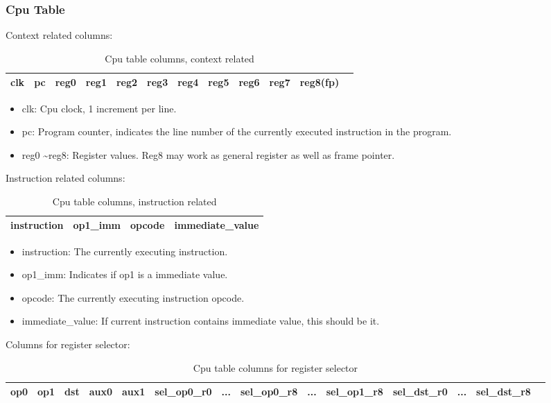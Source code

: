 \subsubsection{Cpu Table} \label{sec:cpu-table}

Context related columns:
\begin{table}[!ht]
    \centering
    \begin{tabular}{|c|c|c|c|c|c|c|c|c|c|c|c|}
        \hline
        clk & pc & reg0 & reg1 & reg2 & reg3 & reg4 & reg5 & reg6 & reg7 & reg8(fp) \\
        \hline
    \end{tabular}
    \caption{Cpu table columns, context related}
    \label{table:cpu-columns-context}
\end{table}

\begin{itemize}
    \item clk: Cpu clock, 1 increment per line.
    \item pc: Program counter, indicates the line number of the currently executed instruction in the program.
    \item reg0 \textasciitilde reg8: Register values. Reg8 may work as general register as well as frame pointer.
\end{itemize}

Instruction related columns:
\begin{table}[!ht]
    \centering
    \begin{tabular}{|c|c|c|c|}
        \hline
        instruction & op1\_imm & opcode & immediate\_value \\
        \hline
    \end{tabular}
    \caption{Cpu table columns, instruction related}
    \label{table:cpu-columns-instruction}
\end{table}

\begin{itemize}
    \item instruction: The currently executing instruction.
    \item op1\_imm: Indicates if op1 is a immediate value.
    \item opcode: The currently executing instruction opcode.
    \item immediate\_value: If current instruction contains immediate value, this should be it.
\end{itemize}

Columns for register selector:
\begin{table}[!ht]
    \centering
    \begin{tabular}{|c|c|c|c|c|c|c|c|c|c|c|c|c|c|}
        \hline
        op0 & op1 & dst & aux0 & aux1 & sel\_op0\_r0 & ... & sel\_op0\_r8 & ... & sel\_op1\_r8 & sel\_dst\_r0 & ... & sel\_dst\_r8 \\
        \hline
    \end{tabular}
    \caption{Cpu table columns for register selector}
    \label{table:cpu-columns-reg-selector}
\end{table}

